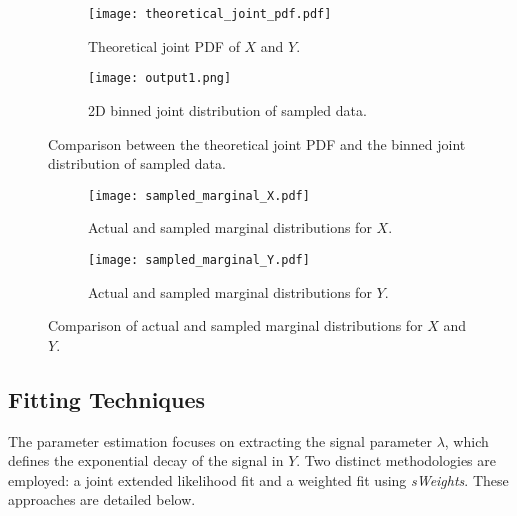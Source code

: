\documentclass[11pt, a4paper]{article}
\begin{document}
\begin{figure}[H]
    \centering
    \begin{subfigure}[b]{0.47\textwidth}
        \centering
        \texttt{[image: theoretical\_joint\_pdf.pdf]}
        \caption{Theoretical joint PDF of \( X \) and \( Y \).}
        \label{fig:joint_pdf_theoretical}
    \end{subfigure}
    \hfill
    \begin{subfigure}[b]{0.47\textwidth}
        \centering
        \texttt{[image: output1.png]}
        \caption{2D binned joint distribution of sampled data.}
        \label{fig:joint_pdf_sampled}
    \end{subfigure}
    \caption{Comparison between the theoretical joint PDF and the binned joint distribution of sampled data.}
    \label{fig:joint_pdf}
\end{figure}


\begin{figure}[H]
    \centering
    \begin{subfigure}[b]{0.47\textwidth}
        \centering
        \texttt{[image: sampled\_marginal\_X.pdf]}
        \caption{Actual and sampled marginal distributions for \( X \).}
        \label{fig:sampled_marginal_X}
    \end{subfigure}
    \hfill
    \begin{subfigure}[b]{0.47\textwidth}
        \centering
        \texttt{[image: sampled\_marginal\_Y.pdf]}
        \caption{Actual and sampled marginal distributions for \( Y \).}
        \label{fig:sampled_marginal_Y}
    \end{subfigure}
    \caption{Comparison of actual and sampled marginal distributions for \( X \) and \( Y \).}
    \label{fig:marginal_sampling}
\end{figure}



\subsection{Fitting Techniques}
The parameter estimation focuses on extracting the signal parameter \(\lambda\), which defines the exponential decay of the signal in \( Y \). Two distinct methodologies are employed: a joint extended likelihood fit and a weighted fit using \textit{sWeights}. These approaches are detailed below.
\end{document}
